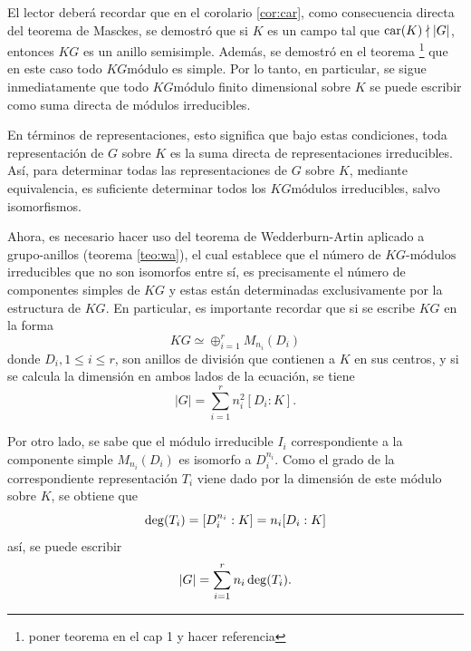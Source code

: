  El lector deberá recordar que en el corolario \ref{cor:car}, como consecuencia directa del teorema de Masckes, se demostró que si $K$ es un campo tal que $\operatorname{car}(K) \nmid |G|$, entonces $KG$ es un anillo semisimple. Además, se demostró en el teorema \footnote{poner teorema en el cap 1 y hacer referencia} que en este caso todo $KG\mbox{módulo}$ es simple. Por lo tanto, en particular, se sigue inmediatamente que todo $KG\mbox{módulo}$ finito dimensional sobre $K$ se puede escribir como suma directa de módulos irreducibles.
 
 En términos de representaciones, esto significa que bajo estas condiciones, toda representación de $G$ sobre $K$ es la suma directa de representaciones irreducibles. Así, para determinar todas las representaciones de $G$ sobre $K$, mediante equivalencia, es suficiente determinar todos los $KG\mbox{módulos}$ irreducibles, salvo isomorfismos. 
 
 Ahora, es necesario hacer uso del teorema de Wedderburn-Artin aplicado a grupo-anillos (teorema \ref{teo:wa}), el cual establece que el número de $KG\mbox{-módulos}$ irreducibles que no son isomorfos entre sí, es precisamente el número de componentes simples de $KG$ y estas están determinadas exclusivamente por la estructura de $KG$. En particular, es importante recordar que si se escribe $KG$ en la forma
 \begin{equation*} KG \simeq \oplus_{i = 1}^{r}M_{n_i}(D_i) \end{equation*} donde $D_i, 1\leq i \leq r$, son anillos de división que contienen a $K$ en sus centros, y si se calcula la dimensión en ambos lados de la ecuación, se tiene
 \begin{equation*} |G| = \sum_{i = 1}^{r}n_{i}^2[D_i:K]. \end{equation*}
 
 Por otro lado, se sabe que el módulo irreducible $I_i$ correspondiente a la componente simple $M_{n_i}(D_i)$ es isomorfo a $D_{i}^{n_i}$. Como el grado de la correspondiente representación $T_i$ viene dado por la dimensión de este módulo sobre $K$, se obtiene que
 \begin{equation*}  \operatorname{deg} (T_i) = [D_{i}^{n_i}:K] = n_i[D_i:K] \end{equation*} así, se puede escribir \begin{equation*} |G| = \sum_{i = 1}^{r}n_i\operatorname{deg}(T_i). \end{equation*} 
 
